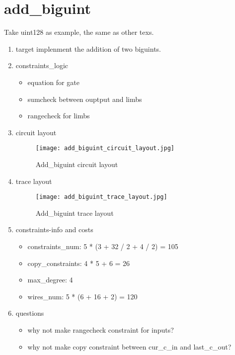 \section{add_biguint}
\label{add_biguint}

Take uint128 as example, the same as other texs.

\begin{enumerate}
    \item target
        implenment the addition of two biguints.
    \item constraints_logic
        \begin{itemize}
            \item equation for gate
            \item sumcheck between ouptput and limbs
            \item rangecheck for limbs
        \end{itemize}
    \item circuit layout
        \begin{figure}[!ht]
            \centering
            \texttt{[image: add\_biguint\_circuit\_layout.jpg]}
            \caption{Add_biguint circuit layout}
            \label{fig:add_biguint_circuit_layout}
        \end{figure}

    \item trace layout
        \begin{figure}[!ht]
            \centering
            \texttt{[image: add\_biguint\_trace\_layout.jpg]}
            \caption{Add_biguint trace layout}
            \label{fig:add_biguint_trace_layout}
        \end{figure}
    
    \item constraints-info and costs
        \begin{itemize}
            \item constraints_num: 5 * (3 + 32 / 2 + 4 / 2) = 105
            \item copy_constraints: 4 * 5 + 6 = 26
            \item max_degree: 4
            \item wires_num: 5 * (6 + 16 + 2) = 120
        \end{itemize}

    \item questions
        \begin{itemize}
            \item why not make rangecheck constraint for inputs?
            \item why not make copy constraint between cur_c_in and last_c_out?
        \end{itemize}

\end{enumerate}